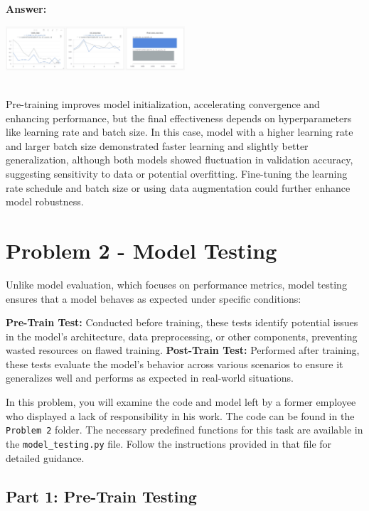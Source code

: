 \documentclass[11pt, oneside]{article}   	%
\begin{document}
\textbf{Answer:} \\
\begin{center}
    \includegraphics[width=0.5\textwidth]{p1p4_pic/PretrainModel.png}
\end{center}
\\
Pre-training improves model initialization, accelerating convergence and enhancing performance, but the final effectiveness depends on hyperparameters like learning rate and batch size. 
In this case, model with a higher learning rate and larger batch size demonstrated faster learning and slightly better generalization, although both models showed fluctuation in validation accuracy, suggesting sensitivity to data or potential overfitting.
Fine-tuning the learning rate schedule and batch size or using data augmentation could further enhance model robustness.


\section*{Problem 2 - Model Testing}
Unlike model evaluation, which focuses on performance metrics, model testing ensures that a model behaves as expected under specific conditions:

\noindent \textbf{Pre-Train Test:} Conducted before training, these tests identify potential issues in the model's architecture, data preprocessing, or other components, preventing wasted resources on flawed training.
 \textbf{Post-Train Test:} Performed after training, these tests evaluate the model's behavior across various scenarios to ensure it generalizes well and performs as expected in real-world situations.

In this problem, you will examine the code and model left by a former employee who displayed a lack of responsibility in his work. The code can be found in the \texttt{Problem 2} folder. The necessary predefined functions for this task are available in the \texttt{model\_testing.py} file. Follow the instructions provided in that file for detailed guidance.

\subsection*{Part 1: Pre-Train Testing}
\end{document}
